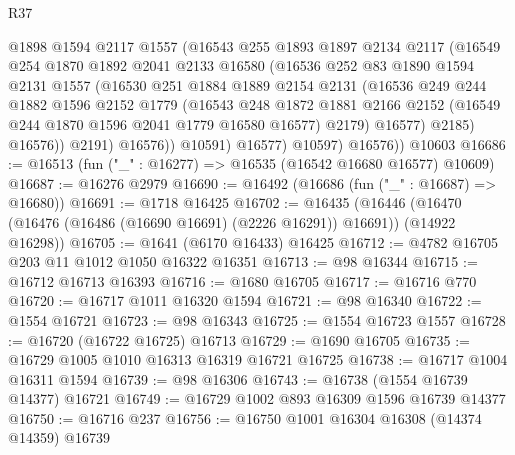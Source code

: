 \begin{lexlean}{R37}
\begin{coremodule}
                  @1898
                  @1594
                  @2117
                  @1557
                  (@16543
                    @255
                    @1893
                    @1897
                    @2134
                    @2117
                    (@16549
                      @254
                      @1870
                      @1892
                      @2041
                      @2133
                      @16580
                      (@16536
                        @252
                        @83
                        @1890
                        @1594
                        @2131
                        @1557
                        (@16530
                          @251
                          @1884
                          @1889
                          @2154
                          @2131
                          (@16536
                            @249
                            @244
                            @1882
                            @1596
                            @2152
                            @1779
                            (@16543
                              @248
                              @1872
                              @1881
                              @2166
                              @2152
                              (@16549 @244 @1870 @1596 @2041 @1779 @16580 @16577)
                              @2179)
                            @16577)
                          @2185)
                        @16576))
                    @2191)
                  @16576))
              @10591)
            @16577)
          @10597)
        @16576))
    @10603
@16686 := @16513 (fun ("_" : @16277) => @16535 (@16542 @16680 @16577) @10609)
@16687 := @16276 @2979
@16690 := @16492 (@16686 (fun ("_" : @16687) => @16680))
@16691 := @1718 @16425
@16702 := @16435
    (@16446 (@16470 (@16476 (@16486 (@16690 @16691) (@2226 @16291)) @16691)) (@14922 @16298))
@16705 := @1641 (@6170 @16433) @16425
@16712 := @4782 @16705 @203 @11 @1012 @1050 @16322 @16351
@16713 := @98 @16344
@16715 := @16712 @16713 @16393
@16716 := @1680 @16705
@16717 := @16716 @770
@16720 := @16717 @1011 @16320 @1594
@16721 := @98 @16340
@16722 := @1554 @16721
@16723 := @98 @16343
@16725 := @1554 @16723 @1557
@16728 := @16720 (@16722 @16725) @16713
@16729 := @1690 @16705
@16735 := @16729 @1005 @1010 @16313 @16319 @16721 @16725
@16738 := @16717 @1004 @16311 @1594
@16739 := @98 @16306
@16743 := @16738 (@1554 @16739 @14377) @16721
@16749 := @16729 @1002 @893 @16309 @1596 @16739 @14377
@16750 := @16716 @237
@16756 := @16750 @1001 @16304 @16308 (@14374 @14359) @16739

\end{coremodule}
\end{lexlean}
